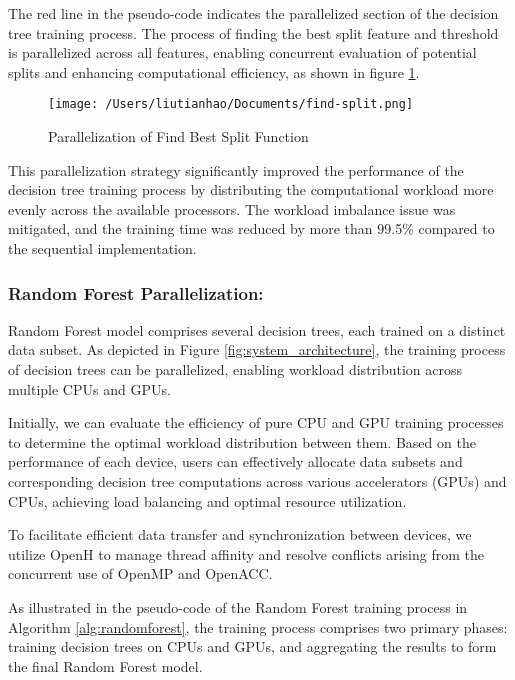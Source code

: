 \documentclass[13pt]{article}
\begin{document}
The red line in the pseudo-code indicates the parallelized section of the decision tree training process.
The process of finding the best split feature and threshold is parallelized across all features, enabling concurrent evaluation of potential splits and enhancing computational efficiency, as shown in figure \ref{fig:parallelization}.

\begin{figure}[ht]
    \centering
    \texttt{[image: /Users/liutianhao/Documents/find-split.png]}
    \caption{Parallelization of Find Best Split Function}
    \label{fig:parallelization}
\end{figure}

This parallelization strategy significantly improved the performance of the decision tree training process by distributing the computational workload more evenly across the available processors.
The workload imbalance issue was mitigated, and the training time was reduced by more than 99.5\% compared to the sequential implementation.

\subsubsection{Random Forest Parallelization:} 
    
Random Forest model comprises several decision trees, each trained on a distinct data subset. As depicted in Figure \ref{fig:system_architecture}, the training process of decision trees can be parallelized, enabling workload distribution across multiple CPUs and GPUs.

Initially, we can evaluate the efficiency of pure CPU and GPU training processes to determine the optimal workload distribution between them. Based on the performance of each device, users can effectively allocate data subsets and corresponding decision tree computations across various accelerators (GPUs) and CPUs, achieving load balancing and optimal resource utilization.

To facilitate efficient data transfer and synchronization between devices, we utilize OpenH to manage thread affinity and resolve conflicts arising from the concurrent use of OpenMP and OpenACC.

As illustrated in the pseudo-code of the Random Forest training process in Algorithm \ref{alg:randomforest}, the training process comprises two primary phases: training decision trees on CPUs and GPUs, and aggregating the results to form the final Random Forest model.
\end{document}
